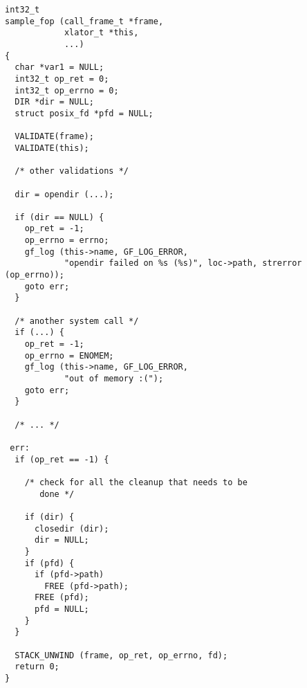 \documentclass{article}[12pt]
\begin{document}
\begin{verbatim}
int32_t 
sample_fop (call_frame_t *frame,
            xlator_t *this,
            ...)
{
  char *var1 = NULL;
  int32_t op_ret = 0;
  int32_t op_errno = 0;
  DIR *dir = NULL;
  struct posix_fd *pfd = NULL;

  VALIDATE(frame);
  VALIDATE(this);

  /* other validations */
  
  dir = opendir (...);

  if (dir == NULL) {
    op_ret = -1;
    op_errno = errno;
    gf_log (this->name, GF_LOG_ERROR, 
            "opendir failed on %s (%s)", loc->path, strerror (op_errno));
    goto err;
  }

  /* another system call */
  if (...) {
    op_ret = -1;
    op_errno = ENOMEM;
    gf_log (this->name, GF_LOG_ERROR,
            "out of memory :(");
    goto err;
  }

  /* ... */

 err:
  if (op_ret == -1) {

    /* check for all the cleanup that needs to be
       done */

    if (dir) {
      closedir (dir);
      dir = NULL;
    }
    if (pfd) {
      if (pfd->path)
        FREE (pfd->path);
      FREE (pfd);
      pfd = NULL;
    }
  }

  STACK_UNWIND (frame, op_ret, op_errno, fd);
  return 0;
}
\end{verbatim}
\end{document}
